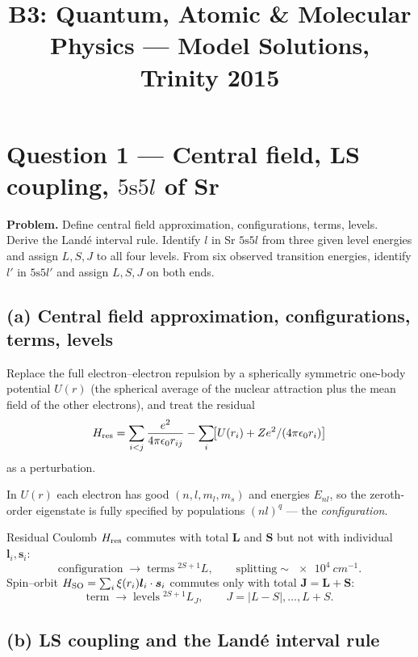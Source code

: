 \documentclass[11pt]{article}
\title{B3: Quantum, Atomic \& Molecular Physics --- Model Solutions, Trinity 2015}
\author{}
\date{}
\begin{document}
\maketitle

\section*{Question 1 --- Central field, LS coupling, $5\mathrm{s}5l$ of Sr}

\textbf{Problem.} Define central field approximation, configurations, terms, levels.
Derive the Land\'e interval rule.
Identify $l$ in Sr $5\mathrm{s}5l$ from three given level energies and assign $L,S,J$ to all four levels.
From six observed transition energies, identify $l'$ in $5\mathrm{s}5l'$ and assign $L,S,J$ on both ends.

\subsection*{(a) Central field approximation, configurations, terms, levels}

Replace the full electron--electron repulsion by a spherically symmetric one-body potential $U(r)$ (the spherical average of the nuclear attraction plus the mean field of the other electrons), and treat the residual
\[
H_{\rm res}=\sum_{i<j}\frac{e^{2}}{4\pi\epsilon_{0}r_{ij}}-\sum_{i}\!\bigl[U(r_{i})+Ze^{2}/(4\pi\epsilon_{0}r_{i})\bigr]
\]
as a perturbation.

In $U(r)$ each electron has good $(n,l,m_l,m_s)$ and energies $E_{nl}$, so the zeroth-order eigenstate is fully specified by populations $(nl)^{q}$ --- the \emph{configuration}.

Residual Coulomb $H_{\rm res}$ commutes with total $\bm L$ and $\bm S$ but not with individual $\bm l_i,\bm s_i$:
\[
\text{configuration}\;\longrightarrow\;\text{terms}\;{}^{2S+1}\!L,\qquad \text{splitting}\sim\SI{e4}{cm^{-1}}.
\]
Spin--orbit $H_{\rm SO}=\sum_i\xi(r_i)\bm l_i\cdot\bm s_i$ commutes only with total $\bm J=\bm L+\bm S$:
\[
\text{term}\;\longrightarrow\;\text{levels}\;{}^{2S+1}\!L_{J},\qquad J=|L-S|,\dots,L+S.
\]

\subsection*{(b) LS coupling and the Land\'e interval rule}
\end{document}
